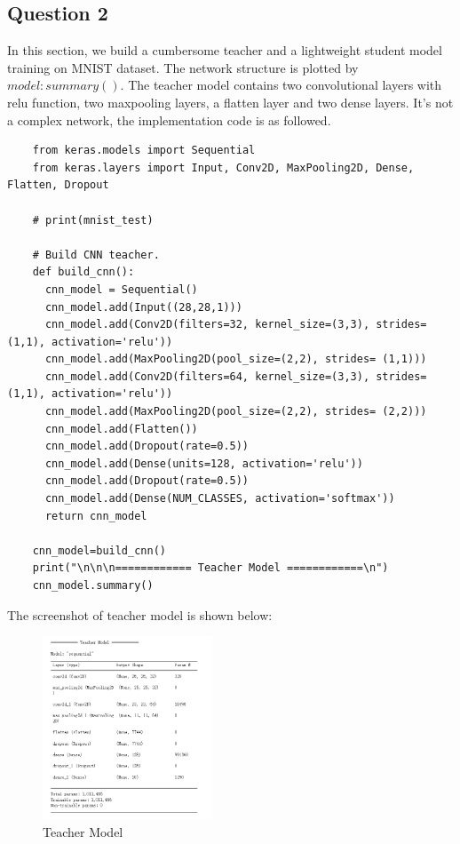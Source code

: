 \documentclass[conference]{IEEEtran}
\begin{document}
\subsection{Question 2}
In this section, we build a cumbersome teacher and a lightweight student model training on MNIST dataset. The network structure is plotted by $model:summary()$.
The teacher model contains two convolutional layers with relu function, two maxpooling layers, a flatten layer and two dense layers. It's not a complex network, the implementation code is as followed.
\begin{lstlisting}
    from keras.models import Sequential
    from keras.layers import Input, Conv2D, MaxPooling2D, Dense, Flatten, Dropout
    
    # print(mnist_test)
    
    # Build CNN teacher.
    def build_cnn():
      cnn_model = Sequential()
      cnn_model.add(Input((28,28,1)))
      cnn_model.add(Conv2D(filters=32, kernel_size=(3,3), strides= (1,1), activation='relu'))
      cnn_model.add(MaxPooling2D(pool_size=(2,2), strides= (1,1)))
      cnn_model.add(Conv2D(filters=64, kernel_size=(3,3), strides= (1,1), activation='relu'))
      cnn_model.add(MaxPooling2D(pool_size=(2,2), strides= (2,2)))
      cnn_model.add(Flatten())
      cnn_model.add(Dropout(rate=0.5))
      cnn_model.add(Dense(units=128, activation='relu'))
      cnn_model.add(Dropout(rate=0.5))
      cnn_model.add(Dense(NUM_CLASSES, activation='softmax'))
      return cnn_model
    
    cnn_model=build_cnn()
    print("\n\n\n============ Teacher Model ============\n")
    cnn_model.summary()
\end{lstlisting} \par
The screenshot of teacher model is shown below:
\begin{figure}[h] 
    \centering
    \includegraphics[width=0.45\textwidth]{./graphs/Teacher_MNIST.png}
    \caption{Teacher Model}
    \label{Fig.t1q3e}
\end{figure}
\end{document}
